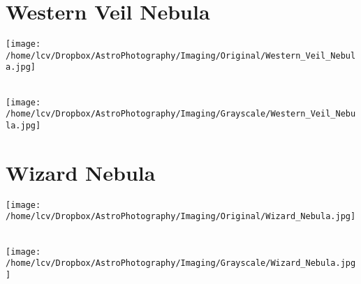 \section{Western Veil Nebula}
\texttt{[image: /home/lcv/Dropbox/AstroPhotography/Imaging/Original/Western\_Veil\_Nebula.jpg]}
{\footnotesize\color{white}

}\ \\
\texttt{[image: /home/lcv/Dropbox/AstroPhotography/Imaging/Grayscale/Western\_Veil\_Nebula.jpg]}
\begin{center}
\end{center}
\section{Wizard Nebula}
\texttt{[image: /home/lcv/Dropbox/AstroPhotography/Imaging/Original/Wizard\_Nebula.jpg]}
{\footnotesize\color{white}

}\ \\
\texttt{[image: /home/lcv/Dropbox/AstroPhotography/Imaging/Grayscale/Wizard\_Nebula.jpg]}
\begin{center}
\end{center}

